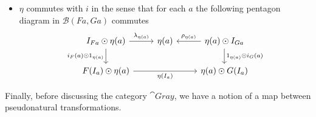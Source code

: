 \begin{defn}{}
\begin{itemize}
        \item $\eta$ commutes with $i$ in the sense that for each $a$ the following pentagon diagram in $\mathcal{B}(Fa,Ga)$ commutes
        \[\begin{tikzcd}
        	{I_{Fa}\odot \eta(a)} & {\eta(a)} & {\eta(a)\odot I_{Ga}} \\
        	{F(I_a)\odot \eta(a)} && {\eta(a)\odot G(I_a)}
        	\arrow["{\lambda_{\eta(a)}}", from=1-1, to=1-2]
        	\arrow["{\rho_{\eta(a)}}"', from=1-3, to=1-2]
        	\arrow["{i_F(a)\odot 1_{\eta(a)}}"', from=1-1, to=2-1]
        	\arrow["{1_{\eta(a)}\odot i_G(a)}", from=1-3, to=2-3]
        	\arrow["{\eta(I_a)}"', from=2-1, to=2-3]
        \end{tikzcd}\]
    \end{itemize}
\end{defn}

Finally, before discussing the category $\cat{Gray}$, we have a notion of a map between pseudonatural transformations.

